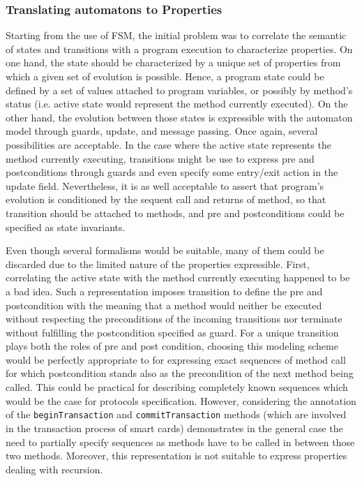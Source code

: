 \subsubsection{Translating automatons to Properties}
Starting from the use of FSM, the initial problem was to correlate the semantic of states and transitions with a program execution to characterize properties. On one hand, the state should be characterized by a unique set of properties from which a given set of evolution is possible. Hence, a program state could be defined by a set of values attached to program variables, or possibly by method's status (i.e. active state would represent the method currently executed). On the other hand, the evolution between those states is expressible with the automaton model through guards, update, and message passing. Once again, several possibilities are acceptable. In the case where the active state represents the method currently executing, transitions might be use to express pre and postconditions through guards and even specify some entry/exit action in the update field. Nevertheless, it is as well acceptable to assert that program's evolution is conditioned by the sequent call and returns of method, so that transition should be attached to methods, and pre and postconditions could be specified as state invariants.

Even though several formalisms would be suitable, many of them could be discarded due to the limited nature of the properties expressible. First, correlating the active state with the method currently executing happened to be a bad idea. Such a representation imposes transition to define the pre and postcondition with the meaning that a method would neither be executed without respecting the preconditions of the incoming transitions nor terminate without fulfilling the postcondition specified as guard. For a unique transition plays both the roles of pre and post condition, choosing this modeling scheme would be perfectly appropriate to for expressing exact sequences of method call for which postcondition stands also as the precondition of the next method being called. This could be practical for describing completely known sequences which would be the case for protocols specification. However, considering the annotation of the {\tt beginTransaction} and {\tt commitTransaction} methods (which are involved in the transaction process of smart cards) demonstrates in the general case the need to partially specify sequences as methods have to be called in between those two methods. Moreover, this representation is not suitable to express properties dealing with recursion.

